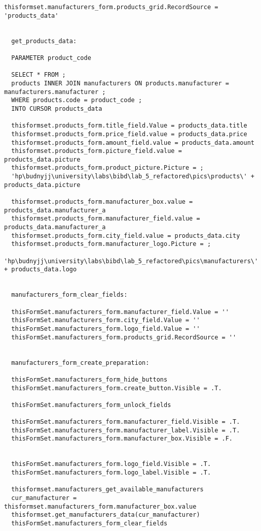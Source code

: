 \begin{lstlisting}[caption=crud\_formset\_procedures]
  thisformset.manufacturers_form.products_grid.RecordSource = 'products_data'


  get_products_data:

  PARAMETER product_code

  SELECT * FROM ;
  products INNER JOIN manufacturers ON products.manufacturer = manufacturers.manufacturer ;
  WHERE products.code = product_code ;
  INTO CURSOR products_data

  thisformset.products_form.title_field.Value = products_data.title
  thisformset.products_form.price_field.value = products_data.price
  thisformset.products_form.amount_field.value = products_data.amount
  thisformset.products_form.picture_field.value = products_data.picture
  thisformset.products_form.product_picture.Picture = ;
  'hp\budnyjj\university\labs\bibd\lab_5_refactored\pics\products\' + products_data.picture

  thisformset.products_form.manufacturer_box.value = products_data.manufacturer_a
  thisformset.products_form.manufacturer_field.value = products_data.manufacturer_a
  thisformset.products_form.city_field.value = products_data.city
  thisformset.products_form.manufacturer_logo.Picture = ;
  'hp\budnyjj\university\labs\bibd\lab_5_refactored\pics\manufacturers\' + products_data.logo


  manufacturers_form_clear_fields:

  thisFormSet.manufacturers_form.manufacturer_field.Value = ''
  thisFormSet.manufacturers_form.city_field.Value = ''
  thisFormSet.manufacturers_form.logo_field.Value = ''
  thisFormSet.manufacturers_form.products_grid.RecordSource = ''


  manufacturers_form_create_preparation:

  thisFormSet.manufacturers_form_hide_buttons
  thisFormSet.manufacturers_form.create_button.Visible = .T.

  thisFormSet.manufacturers_form_unlock_fields

  thisFormSet.manufacturers_form.manufacturer_field.Visible = .T.
  thisFormSet.manufacturers_form.manufacturer_label.Visible = .T.
  thisFormSet.manufacturers_form.manufacturer_box.Visible = .F.


  thisFormSet.manufacturers_form.logo_field.Visible = .T.
  thisFormSet.manufacturers_form.logo_label.Visible = .T.

  thisformset.manufacturers_get_available_manufacturers
  cur_manufacturer = thisformset.manufacturers_form.manufacturer_box.value
  thisformset.get_manufacturers_data(cur_manufacturer)
  thisFormSet.manufacturers_form_clear_fields


\end{lstlisting}
